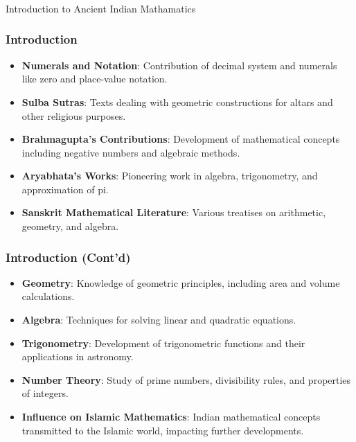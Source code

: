 \begin{frame}[fragile]\frametitle{}
\begin{center}
{\Large Introduction to Ancient Indian Mathamatics}
\end{center}
\end{frame}

\begin{frame}[fragile]\frametitle{Introduction}
    
    \begin{itemize}
        \item \textbf{Numerals and Notation}: Contribution of decimal system and numerals like zero and place-value notation.
        \item \textbf{Sulba Sutras}: Texts dealing with geometric constructions for altars and other religious purposes.
        \item \textbf{Brahmagupta's Contributions}: Development of mathematical concepts including negative numbers and algebraic methods.
        \item \textbf{Aryabhata's Works}: Pioneering work in algebra, trigonometry, and approximation of pi.
        \item \textbf{Sanskrit Mathematical Literature}: Various treatises on arithmetic, geometry, and algebra.
    \end{itemize}
\end{frame}

\begin{frame}[fragile]\frametitle{Introduction (Cont'd)}
    
    \begin{itemize}
        \item \textbf{Geometry}: Knowledge of geometric principles, including area and volume calculations.
        \item \textbf{Algebra}: Techniques for solving linear and quadratic equations.
        \item \textbf{Trigonometry}: Development of trigonometric functions and their applications in astronomy.
        \item \textbf{Number Theory}: Study of prime numbers, divisibility rules, and properties of integers.
        \item \textbf{Influence on Islamic Mathematics}: Indian mathematical concepts transmitted to the Islamic world, impacting further developments.
    \end{itemize}
\end{frame}

